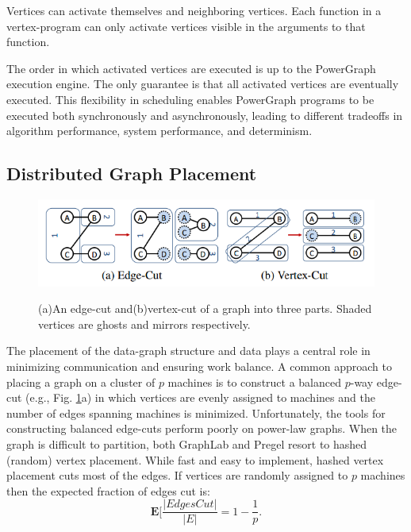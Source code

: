 \documentclass {article}
\begin{document}
Vertices can activate themselves and neighboring vertices.
Each function in a vertex-program can only activate vertices
visible in the arguments to that function. 

The order in which activated vertices are executed is up
to the PowerGraph execution engine. The only guarantee
is that all activated vertices are eventually executed. This
flexibility in scheduling enables PowerGraph programs
to be executed both synchronously and asynchronously,
leading to different tradeoffs in algorithm performance,
system performance, and determinism.


\subsection{Distributed Graph Placement}

\begin{figure}
  \centering
  \includegraphics[width=\textwidth]{cut.png}\\
  \caption{(a)An edge-cut and(b)vertex-cut of a graph
  into   three parts. Shaded vertices are ghosts and
  mirrors respectively.}\label{cut}
\end{figure}

The placement of the data-graph structure and data plays
a central role in minimizing communication and ensuring
work balance. A common approach to placing a graph on a
cluster of $p$ machines is to construct a balanced $p$-way
edge-cut (e.g., Fig. \ref{cut}a) in which vertices are evenly
assigned to machines and the number of edges spanning machines
is minimized. Unfortunately, the tools for constructing balanced 
edge-cuts perform poorly on power-law graphs. When the graph
is difficult to partition, both GraphLab and Pregel resort
to hashed (random) vertex placement. While fast and easy to
implement, hashed vertex placement cuts most of the edges. If 
vertices are randomly assigned to $p$ machines then the expected
fraction of edges cut is:
\begin{equation}
  \textbf{E}[\frac{|Edges Cut|}{|E|} = 1 - \frac{1}{p}.
\end{equation}
\end{document}
